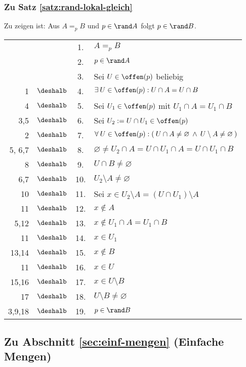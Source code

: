 \subsubsection{Zu Satz \ref{satz:rand-lokal-gleich}}\label{anh:rand-lokal-gleich}
    Zu zeigen ist: Aus $A =_p B$ und $p \in \rand A$ folgt $p \in \rand B$.
%
    \begin{longtable}{r c c l}
        & & 1. & $A =_p B$\\
        & & 2. & $p \in \rand A$ \\
        & & 3. & Sei $U \in \offen(p)$ beliebig \\
        1 & $\deshalb$ & 4. & $\exists\: U \in \offen(p) : U \cap A = U \cap B$ \\
        4 & $\deshalb$ & 5. & Sei $U_1 \in \offen(p)$ mit $U_1 \cap A = U_1 \cap B$ \\
        3,5 & $\deshalb$ & 6. & Sei $U_2 := U \cap U_1 \in \offen(p)$ \\
        2 & $\deshalb$ & 7. & $\forall\: U \in \offen(p): (\: U \cap A \neq \varnothing \:\land\: U \setminus A \neq \varnothing \:)$ \\
        5, 6,7 & $\deshalb$ & 8. & $\varnothing \neq U_2 \cap A = U \cap U_1 \cap A = U \cap U_1 \cap B$\\
        8 & $\deshalb$ & 9. & $U \cap B \neq \varnothing$\\
        6,7 & $\deshalb$ & 10. & $U_2 \setminus A \neq \varnothing$\\
        10 & $\deshalb$ & 11. & Sei $x \in U_2 \setminus A = (U \cap U_1) \setminus A$\\
        11 & $\deshalb$ & 12. & $x \notin A$\\
        5,12 & $\deshalb$ & 13. & $x \notin U_1 \cap A = U_1 \cap B$\\
        11 & $\deshalb$ & 14. & $x \in U_1$\\
        13,14 & $\deshalb$ & 15. & $x \notin B$\\
        11 & $\deshalb$ & 16. & $x \in U$\\
        15,16 & $\deshalb$ & 17. & $x \in U \setminus B$\\
        17 & $\deshalb$ & 18. & $U \setminus B \neq \varnothing$\\
        3,9,18 & $\deshalb$ & 19. & $p \in \rand B$
    \end{longtable}	



\subsection{Zu Abschnitt \ref{sec:einf-mengen} (Einfache Mengen)}


